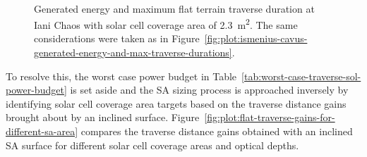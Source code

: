 \documentclass[twocolumn,letterpaper]{IEEEAerospaceCLS}  %
\newcommand{\refFig}[1]{{Figure}~\ref{#1}} %
\newcommand{\refTab}[1]{{Table}~\ref{#1}}  %
\newlength{\subfigureWidth}
\begin{document}
\begin{figure}[h]
\begin{subfigure}[t]{\subfigureWidth}
    \label{fig:plot:sub:iani-chaos-max-traverse-durations}
  \end{subfigure}\\[0.8ex]
  \caption{Generated energy and maximum flat terrain traverse duration at Iani Chaos with solar cell coverage area of \SI{2.3}{m^{2}}. The same considerations were taken as in \refFig{fig:plot:ismenius-cavus-generated-energy-and-max-traverse-durations}.}
  \label{fig:plot:iani-chaos-generated-energy-and-max-traverse-durations}
\end{figure}

To resolve this, the worst case power budget in \refTab{tab:worst-case-traverse-sol-power-budget} is set aside and the \ac{SA} sizing process is approached inversely by identifying solar cell coverage area targets based on the traverse distance gains brought about by an inclined surface. \refFig{fig:plot:flat-traverse-gains-for-different-sa-area} compares the traverse distance gains obtained with an inclined \ac{SA} surface for different solar cell coverage areas and optical depths.
\end{document}
